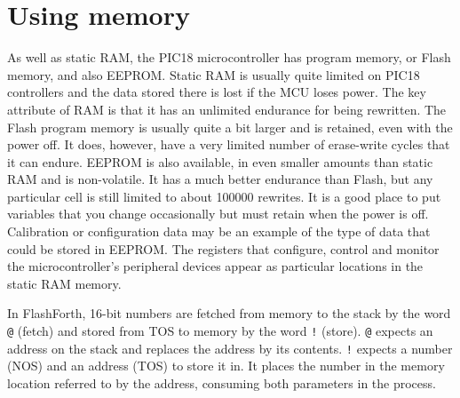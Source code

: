 \documentclass[12pt,a4paper]{article}
\begin{document}
\section{Using memory}
\label{sec:memory}
%
As well as static RAM, the PIC18 microcontroller has program memory, or Flash memory,
and also EEPROM.
Static RAM is usually quite limited on PIC18 controllers and the data stored there is
lost if the MCU loses power.
The key attribute of RAM is that it has an unlimited endurance for being rewritten.
The Flash program memory is usually quite a bit larger and is retained, even with the power off.
It does, however, have a very limited number of erase-write cycles that it can endure.
EEPROM is also available, in even smaller amounts than static RAM and is non-volatile.
It has a much better endurance than Flash, but any particular cell 
is still limited to about 100000 rewrites.
It is a good place to put variables that you change occasionally but must retain when the power is off.
Calibration or configuration data may be an example of the type of data 
that could be stored in EEPROM.
The registers that configure, control and monitor the microcontroller's peripheral devices 
appear as particular locations in the static RAM memory.

\medskip
In FlashForth, 16-bit numbers are fetched from memory to the stack by the word \verb!@! (fetch)
and stored from TOS to memory by the word \verb?!? (store).
\verb?@? expects an address on the stack and replaces the address by its contents.
\verb?!? expects a number (NOS) and an address (TOS) to store it in.
It places the number in the memory location referred to by the address, 
consuming both parameters in the process.
\end{document}
